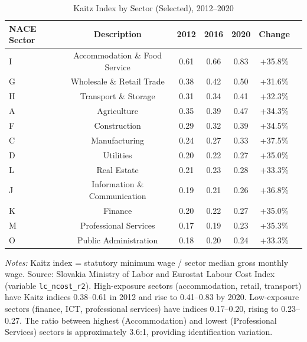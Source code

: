 \begin{table}[h]
\centering
\caption{Kaitz Index by Sector (Selected), 2012--2020}
\label{tab:kaitz}
\tiny
\begin{tabular}{lcccccc}
\hline\hline
NACE Sector & Description & 2012 & 2016 & 2020 & Change \\
\hline
I & Accommodation \& Food Service & 0.61 & 0.66 & 0.83 & +35.8\% \\
G & Wholesale \& Retail Trade & 0.38 & 0.42 & 0.50 & +31.6\% \\
H & Transport \& Storage & 0.31 & 0.34 & 0.41 & +32.3\% \\
A & Agriculture & 0.35 & 0.39 & 0.47 & +34.3\% \\
F & Construction & 0.29 & 0.32 & 0.39 & +34.5\% \\
\hline
C & Manufacturing & 0.24 & 0.27 & 0.33 & +37.5\% \\
D & Utilities & 0.20 & 0.22 & 0.27 & +35.0\% \\
L & Real Estate & 0.21 & 0.23 & 0.28 & +33.3\% \\
\hline
J & Information \& Communication & 0.19 & 0.21 & 0.26 & +36.8\% \\
K & Finance & 0.20 & 0.22 & 0.27 & +35.0\% \\
M & Professional Services & 0.17 & 0.19 & 0.23 & +35.3\% \\
O & Public Administration & 0.18 & 0.20 & 0.24 & +33.3\% \\
\hline\hline
\end{tabular}
\begin{flushleft}
\small \textit{Notes:} Kaitz index = statutory minimum wage / sector median gross monthly wage. Source: Slovakia Ministry of Labor and Eurostat Labour Cost Index (variable \texttt{lc\_ncost\_r2}). High-exposure sectors (accommodation, retail, transport) have Kaitz indices 0.38--0.61 in 2012 and rise to 0.41--0.83 by 2020. Low-exposure sectors (finance, ICT, professional services) have indices 0.17--0.20, rising to 0.23--0.27. The ratio between highest (Accommodation) and lowest (Professional Services) sectors is approximately 3.6:1, providing identification variation.
\end{flushleft}
\end{table}
